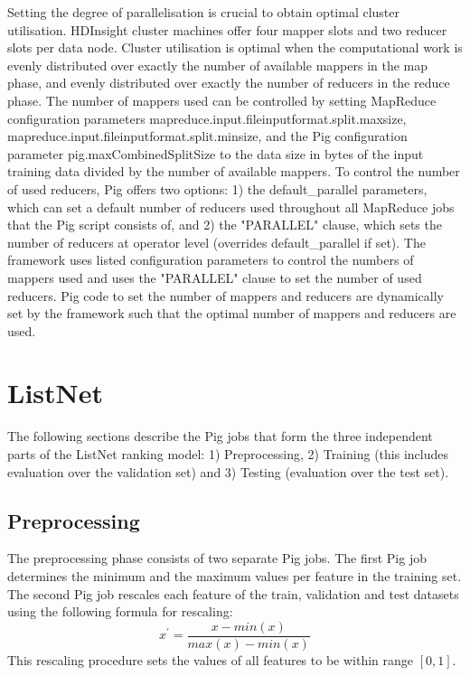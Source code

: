 Setting the degree of parallelisation is crucial to obtain optimal cluster utilisation. HDInsight cluster machines offer four mapper slots and two reducer slots per data node. Cluster utilisation is optimal when the computational work is evenly distributed over exactly the number of available mappers in the map phase, and evenly distributed over exactly the number of reducers in the reduce phase. The number of mappers used can be controlled by setting MapReduce configuration parameters mapreduce.input.fileinputformat.split.maxsize, mapreduce.input.fileinputformat.split.minsize, and the Pig configuration parameter pig.maxCombinedSplitSize to the data size in bytes of the input training data divided by the number of available mappers. To control the number of used reducers, Pig offers two options: 1) the default\_parallel parameters, which can set a default number of reducers used throughout all MapReduce jobs that the Pig script consists of, and 2) the "PARALLEL" clause, which sets the number of reducers at operator level (overrides default\_parallel if set). The framework uses listed configuration parameters to control the numbers of mappers used and uses the "PARALLEL" clause to set the number of used reducers. Pig code to set the number of mappers and reducers are dynamically set by the framework such that the optimal number of mappers and reducers are used.

\section{ListNet}
The following sections describe the Pig jobs that form the three independent parts of the ListNet ranking model: 1) Preprocessing, 2) Training (this includes evaluation over the validation set) and 3) Testing (evaluation over the test set). 
\subsection{Preprocessing}
The preprocessing phase consists of two separate Pig jobs. The first Pig job determines the minimum and the maximum values per feature in the training set. The second Pig job rescales each feature of the train, validation and test datasets using the following formula for rescaling:
\begin{equation}
x^{'} = \frac{x-min(x)}{max(x)-min(x)}
\end{equation}
This rescaling procedure sets the values of all features to be within range $[0,1]$.\\

